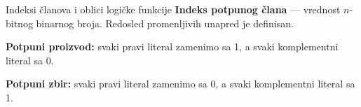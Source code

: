 \begin{frame}[label=02-s009b]{Indeksi članova i oblici logičke funkcije}
\textbf{Indeks potpunog člana} — vrednost \(n\)-bitnog binarnog broja. Redosled promenljivih unapred je definisan.
\par\vspace{3mm}
\textbf{Potpuni proizvod:} svaki pravi literal zamenimo sa \alert{1}, a svaki komplementni literal sa \alert{0}.
\par\vspace{3mm}
\textbf{Potpuni zbir:} svaki pravi literal zamenimo sa \alert{0}, a svaki komplementni literal sa \alert{1}.
\par\vspace{5mm}
\par\vspace{3mm}
\end{frame}
